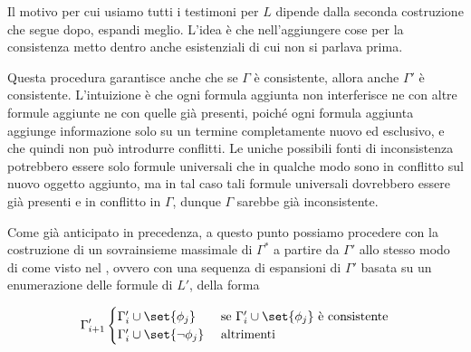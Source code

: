 \begin{note}
  Il motivo per cui usiamo tutti i testimoni per \(L\) dipende dalla seconda costruzione che segue dopo, espandi meglio. L'idea è che nell'aggiungere cose per la consistenza metto dentro anche esistenziali di cui non si parlava prima.
\end{note}

Questa procedura garantisce anche che se \(\Gamma\) è consistente, allora anche \(\Gamma'\) è consistente. L'intuizione è che ogni formula aggiunta non interferisce ne con altre formule aggiunte ne con quelle già presenti, poiché ogni formula aggiunta aggiunge informazione solo su un termine completamente nuovo ed esclusivo, e che quindi non può introdurre conflitti. Le uniche possibili fonti di inconsistenza potrebbero essere solo formule universali che in qualche modo sono in conflitto sul nuovo oggetto aggiunto, ma in tal caso tali formule universali dovrebbero essere già presenti e in conflitto in \(\Gamma\), dunque \(\Gamma\) sarebbe già inconsistente.

Come già anticipato in precedenza, a questo punto possiamo procedere con la costruzione di un sovrainsieme massimale di \(\Gamma^*\) a partire da \(\Gamma'\) allo stesso modo di come visto nel , ovvero con una sequenza di espansioni di \(\Gamma'\) basata su un enumerazione delle formule di \(L'\), della forma

\[\Gamma_{i+1}' \begin{cases}
                  \Gamma_i' \cup \set{\phi_j} & \text{ se } \Gamma_i' \cup \set{\phi_j} \text{ è consistente}\\
                  \Gamma_i' \cup \set{\neg \phi_j} & \text{ altrimenti}
                \end{cases}
\]

